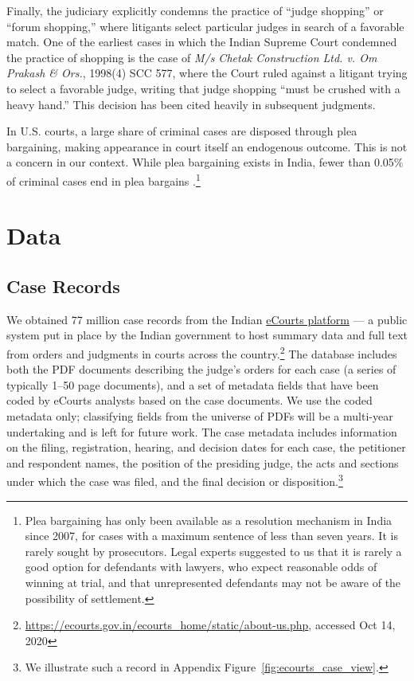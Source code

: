 \documentclass[12pt,english]{article}
\begin{document}
Finally, the judiciary explicitly condemns the practice of ``judge shopping'' or ``forum shopping,'' where litigants select particular judges in search of a favorable match. One of the earliest cases in which the Indian Supreme Court condemned the practice of shopping is the case of \textit{M/s Chetak Construction Ltd. v. Om Prakash \& Ors.}, 1998(4) SCC 577, where the Court ruled against a litigant trying to select a favorable judge, writing that judge shopping ``must be crushed with a heavy hand.'' This decision has been cited heavily in subsequent judgments.

In U.S. courts, a large share of criminal cases are disposed through plea bargaining, making appearance in court itself an endogenous outcome. This is not a concern in our context. While plea bargaining exists in India, fewer than 0.05\% of criminal cases end in plea bargains \citep{ncrb2018}.\footnote{Plea bargaining has only been available as a resolution mechanism in India since 2007, for cases with a maximum sentence of less than seven years. It is rarely sought by prosecutors. Legal experts suggested to us that it is rarely a good option for defendants with lawyers, who expect reasonable odds of winning at trial, and that unrepresented defendants may not be aware of the possibility of settlement.}

\section{Data}
\label{sec:data}

\subsection{Case Records}

We obtained 77 million case records from the Indian \href{https://ecourts.gov.in}{eCourts platform} --- a public system put in place by the Indian government to host summary data and full text from orders and judgments in courts across the country.\footnote{\href{https://ecourts.gov.in/ecourts_home/static/about-us.php}{https://ecourts.gov.in/ecourts\_home/static/about-us.php}, accessed Oct 14, 2020} The database includes both the PDF documents describing the judge's orders for each case (a series of typically 1--50 page documents), and a set of metadata fields that have been coded by eCourts analysts based on the case documents. We use the coded metadata only; classifying fields from the universe of PDFs will be a multi-year undertaking and is left for future work. The case metadata includes information on the filing, registration, hearing, and decision dates for each case, the petitioner and respondent names, the position of the presiding judge, the acts and sections under which the case was filed, and the final decision or disposition.\footnote{We illustrate such a record in Appendix Figure~\ref{fig:ecourts_case_view}.}
\end{document}
